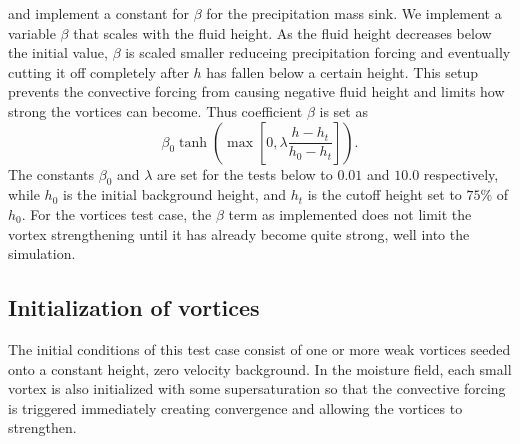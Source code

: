     \cite{bouchut2009fronts} and \cite{lahaye2016understanding} implement a constant 
    for $\beta$ for the precipitation mass sink. We implement a variable $\beta$ that scales with
    the fluid height.  As the fluid height decreases below the initial value, $\beta$ is 
    scaled smaller reduceing precipitation forcing and eventually cutting it 
    off completely after $h$ has fallen below a certain height. 
    This setup prevents the convective forcing from causing negative fluid height
    and limits how strong the vortices can become.
    Thus coefficient $\beta$ is set as 
  \begin{equation}
    \label{eq:beta} \beta_0 \tanh\left(\max\left[0, \lambda \frac{h - h_t}{h_0 - h_t}\right]\right).
  \end{equation}
   The constants $\beta_0$ and $\lambda$ are set for the tests below to $0.01$ and $10.0$ respectively, 
   while $h_0$ is the initial background height, and $h_t$ is the cutoff height set to $75\%$ of $h_0$.
   For the vortices test case, the $\beta$ term as implemented does not limit the vortex strengthening
   until it has already become quite strong, well into the simulation.

 \subsection{Initialization of vortices}
  The initial conditions of this test case consist of
  one or more weak vortices seeded onto a constant height, zero velocity background.
  In the moisture field, each small vortex is also initialized with some supersaturation
  so that the convective forcing is triggered immediately creating convergence 
  and allowing the vortices to strengthen.
  
